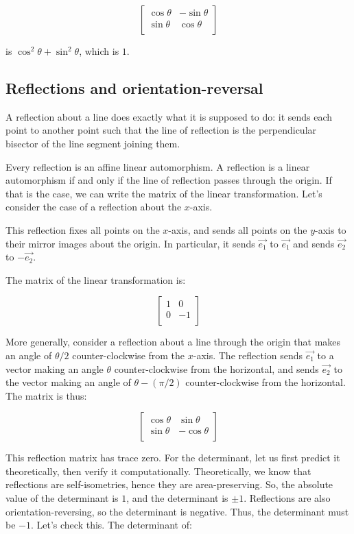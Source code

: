 \documentclass[10pt]{amsart}
\begin{document}
$$\left[\begin{matrix} \cos \theta & - \sin \theta \\ \sin \theta & \cos \theta \\\end{matrix}\right]$$

is $\cos^2\theta + \sin^2\theta$, which is $1$.

\subsection{Reflections and orientation-reversal}

A reflection about a line does exactly what it is supposed to do: it
sends each point to another point such that the line of reflection is
the perpendicular bisector of the line segment joining them.

Every reflection is an affine linear automorphism. A reflection is a
linear automorphism if and only if the line of reflection passes
through the origin. If that is the case, we can write the matrix of
the linear transformation. Let's consider the case of a reflection
about the $x$-axis.

This reflection fixes all points on the $x$-axis, and sends all points
on the $y$-axis to their mirror images about the origin. In
particular, it sends $\vec{e_1}$ to $\vec{e_1}$ and sends $\vec{e_2}$
to $-\vec{e_2}$. 

The matrix of the linear transformation is:

$$\left[\begin{matrix} 1 & 0 \\ 0 & -1 \\\end{matrix}\right]$$

More generally, consider a reflection about a line through the origin
that makes an angle of $\theta/2$ counter-clockwise from the
$x$-axis. The reflection sends $\vec{e_1}$ to a vector making an angle
$\theta$ counter-clockwise from the horizontal, and sends $\vec{e_2}$
to the vector making an angle of $\theta - (\pi/2)$ counter-clockwise
from the horizontal. The matrix is thus:

$$\left[\begin{matrix} \cos \theta & \sin \theta \\ \sin \theta & - \cos \theta \\\end{matrix}\right]$$

This reflection matrix has trace zero. For the determinant, let us
first predict it theoretically, then verify it
computationally. Theoretically, we know that reflections are
self-isometries, hence they are area-preserving. So, the absolute
value of the determinant is $1$, and the determinant is $\pm
1$. Reflections are also orientation-reversing, so the determinant is
negative. Thus, the determinant must be $-1$. Let's check this. The
determinant of:
\end{document}
